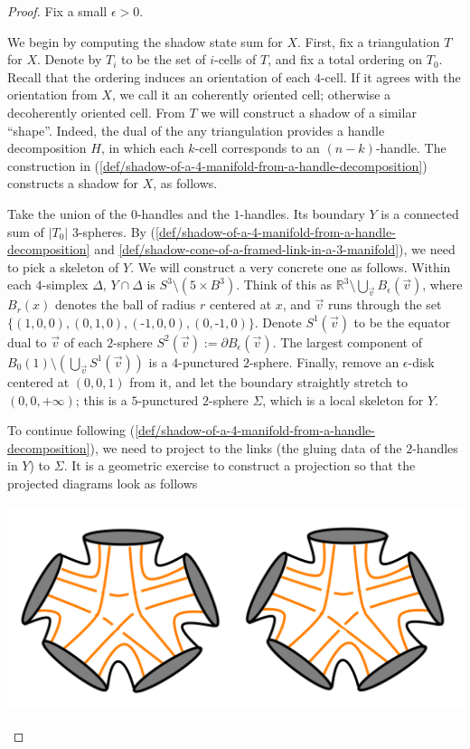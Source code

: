 \documentclass[12pt]{extarticle}
\numberwithin{equation}{section} %
\theoremstyle{mystyle}
\begin{document}
\begin{proof}
  Fix a small $\epsilon > 0$.

  We begin by computing the shadow state sum for $X$. First, fix
  a triangulation $T$ for $X$. Denote by $T_{i}$ to be the set of
  $i$-cells of $T$, and fix a total ordering on $T_{0}$. Recall
  that the ordering induces an orientation of each $4$-cell. If
  it agrees with the orientation from $X$, we call it an
  coherently oriented cell; otherwise a decoherently oriented
  cell. From $T$ we will construct a shadow of a similar
  ``shape''. Indeed, the dual of the any triangulation provides a
  handle decomposition $H$, in which each $k$-cell corresponds to
  an $(n-k)$-handle. The construction in
  (\ref{def/shadow-of-a-4-manifold-from-a-handle-decomposition})
  constructs a shadow for $X$, as follows.

  Take the union of the $0$-handles and the $1$-handles. Its
  boundary $Y$ is a connected sum of $|T_{0}|$ $3$-spheres. By
  (\ref{def/shadow-of-a-4-manifold-from-a-handle-decomposition}
  and \ref{def/shadow-cone-of-a-framed-link-in-a-3-manifold}), we
  need to pick a skeleton of $Y$. We will construct a very
  concrete one as follows. Within each $4$-simplex $\Delta$,
  $Y \cap \Delta$ is $S^{3} \setminus (5 \times B^{3})$. Think of
  this as
  $\mathbb{R}^{3} \setminus \bigcup_{\vec{v}} B_{\epsilon}(\vec{v})$,
  where $B_{r}(x)$ denotes the ball of radius $r$ centered at
  $x$, and $\vec{v}$ runs through the set
  $\{(1,0,0), (0,1,0), (\text{-}1,0,0), (0,\text{-}1,0)\}$.
  Denote $S^{1}(\vec{v})$ to be the equator dual to $\vec{v}$ of
  each $2$-sphere
  $S^{2}(\vec{v}) := \partial B_{\epsilon}(\vec{v})$. The largest
  component of
  $B_{0}(1) \setminus \left(\bigcup_{\vec{v}}S^{1}(\vec{v})\right)$
  is a $4$-punctured $2$-sphere. Finally, remove an
  $\epsilon$-disk centered at $(0,0,1)$ from it, and let the
  boundary straightly stretch to $(0,0,+\infty)$; this is a
  $5$-punctured $2$-sphere $\Sigma$, which is a local skeleton
  for $Y$.

  To continue following
  (\ref{def/shadow-of-a-4-manifold-from-a-handle-decomposition}),
  we need to project to the links (the gluing data of the
  $2$-handles in $Y$) to $\Sigma$. It is a geometric exercise to
  construct a projection so that the projected diagrams look as
  follows

  \begin{center}
    \includegraphics[height=6cm]{main-shadow}
  \end{center}


\end{proof}
\end{document}
